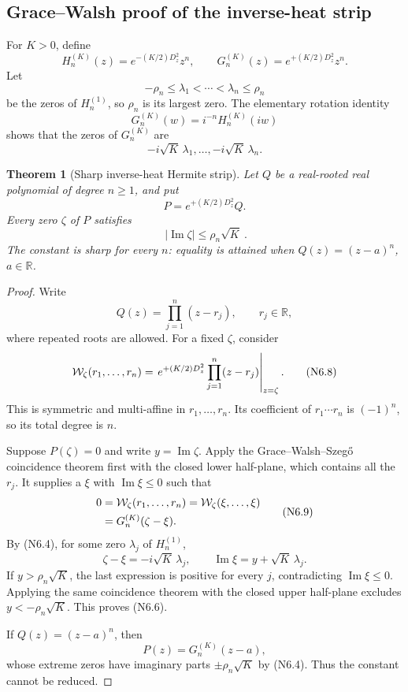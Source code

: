 \documentclass[11pt]{article}
\newtheorem{theorem}{Theorem}[section]
\theoremstyle{definition}
\theoremstyle{remark}
\newcommand{\abs}[1]{\left\lvert #1\right\rvert}
\begin{document}
\subsection{Grace--Walsh proof of the inverse-heat strip}

For \(K>0\), define
\[
 H_n^{(K)}(z)=e^{-(K/2)D_z^2}z^n,
 \qquad
 G_n^{(K)}(z)=e^{+(K/2)D_z^2}z^n.
 \tag{N6.1}
\]
Let
\[
 -\rho_n\le\lambda_1<\cdots<\lambda_n\le\rho_n
 \tag{N6.2}
\]
be the zeros of \(H_n^{(1)}\), so \(\rho_n\) is its largest zero.
The elementary rotation identity
\[
 G_n^{(K)}(w)
 =i^{-n}H_n^{(K)}(iw)
 \tag{N6.3}
\]
shows that the zeros of \(G_n^{(K)}\) are
\[
 -i\sqrt K\,\lambda_1,\ldots,-i\sqrt K\,\lambda_n.
 \tag{N6.4}
\]

\begin{theorem}[Sharp inverse-heat Hermite strip]
\label{thm:f2v6-strip}
Let \(Q\) be a real-rooted real polynomial of degree \(n\ge1\), and put
\[
 P=e^{+(K/2)D_z^2}Q.
 \tag{N6.5}
\]
Every zero \(\zeta\) of \(P\) satisfies
\[
 \boxed{\ \abs{\operatorname{Im}\zeta}\le\rho_n\sqrt K\ }.
 \tag{N6.6}
\]
The constant is sharp for every \(n\): equality is attained when
\(Q(z)=(z-a)^n\), \(a\in\mathbb R\).
\end{theorem}

\begin{proof}
Write
\[
 Q(z)=\prod_{j=1}^n(z-r_j),\qquad r_j\in\mathbb R,
 \tag{N6.7}
\]
where repeated roots are allowed.  For a fixed \(\zeta\), consider
\[
 {\cal W}_{\zeta}(r_1,\ldots,r_n)
 =
 \left.
 e^{+(K/2)D_z^2}\prod_{j=1}^n(z-r_j)
 \right|_{z=\zeta}.
 \tag{N6.8}
\]
This is symmetric and multi-affine in \(r_1,\ldots,r_n\).  Its coefficient
of \(r_1\cdots r_n\) is \((-1)^n\), so its total degree is \(n\).

Suppose \(P(\zeta)=0\) and write \(y=\operatorname{Im}\zeta\).  Apply the
Grace--Walsh--Szeg\H{o} coincidence theorem first with the closed lower
half-plane, which contains all the \(r_j\).  It supplies a
\(\xi\) with \(\operatorname{Im}\xi\le0\) such that
\[
\begin{aligned}
 0
 &={\cal W}_{\zeta}(r_1,\ldots,r_n)
 ={\cal W}_{\zeta}(\xi,\ldots,\xi)\\
 &=G_n^{(K)}(\zeta-\xi).
\end{aligned}
\tag{N6.9}
\]
By \textup{(N6.4)}, for some zero \(\lambda_j\) of \(H_n^{(1)}\),
\[
 \zeta-\xi=-i\sqrt K\,\lambda_j,
 \qquad
 \operatorname{Im}\xi=y+\sqrt K\,\lambda_j.
 \tag{N6.10}
\]
If \(y>\rho_n\sqrt K\), the last expression is positive for every \(j\),
contradicting \(\operatorname{Im}\xi\le0\).  Applying the same coincidence
theorem with the closed upper half-plane excludes
\(y<-\rho_n\sqrt K\).  This proves \textup{(N6.6)}.

If \(Q(z)=(z-a)^n\), then
\[
 P(z)=G_n^{(K)}(z-a),
 \tag{N6.11}
\]
whose extreme zeros have imaginary parts
\(\pm\rho_n\sqrt K\) by \textup{(N6.4)}.  Thus the constant cannot be
reduced.
\end{proof}
\end{document}
